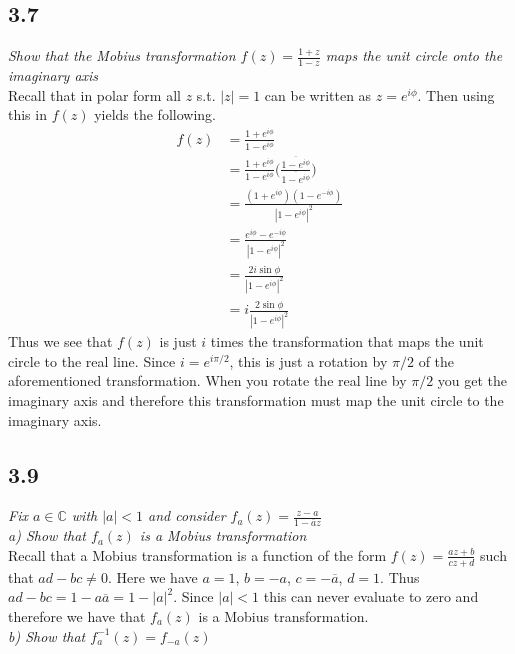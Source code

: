 \documentclass[a4paper, 11pt]{article}
\begin{document}
\subsection*{3.7}
	\textit{Show that the Mobius transformation $f(z) = \frac{1+z}{1-z}$ maps the unit circle onto the imaginary axis}\\ 
	
	\noindent Recall that in polar form all $z$ s.t. $|z|=1$ can be written as $z=e^{i\phi}$. Then using this in $f(z)$ yields the following. 
		\begin{align*}
			f(z) &= \frac{1+e^{i\phi}}{1-e^{i\phi}} \\ 
				&= \frac{1+e^{i\phi}}{1-e^{i\phi}}\Big(\frac{\overline{1-e^{i\phi}}}{\overline{1-e^{i\phi}}}\Big) \\ 
				&= \frac{(1+e^{i\phi})(1-e^{-i\phi})}{|1-e^{i\phi}|^2} \\ 
				&= \frac{e^{i\phi}-e^{-i\phi}}{|1-e^{i\phi}|^2} \\ 
				&= \frac{2i\sin\phi}{|1-e^{i\phi}|^2} \\ 
				&= i \frac{2\sin\phi}{|1-e^{i\phi}|^2}
		\end{align*}	
	\noindent Thus we see that $f(z)$ is just $i$ times the transformation that maps the unit circle to the real line. Since $i=e^{i\pi/2}$, this is just a rotation by $\pi/2$ of the aforementioned  transformation. When you rotate the real line by $\pi/2$ you get the imaginary axis and therefore this transformation must map the unit circle to the imaginary axis.\\
	
\subsection*{3.9}
	\textit{Fix $a\in\mathbb{C}$ with $|a|<1$ and consider $f_a(z)=\frac{z-a}{1-\overline{a}z}$} \\ 
	
	\textit{a) Show that $f_a(z)$ is a Mobius transformation}  \\ 
	
	\noindent Recall that a Mobius transformation is a function of the form $f(z) = \frac{az+b}{cz+d}$ such that $ad-bc\neq 0$. Here we have $a=1$, $b=-a$, $c=-\overline{a}$, $d=1$. Thus $ad-bc =1-a\overline{a}=1-|a|^2$. Since $|a|<1$ this can never evaluate to zero and therefore we have that $f_a(z)$ is a Mobius transformation. \\
	
	\noindent \textit{b) Show that $f_a^{-1}(z) = f_{-a}(z)$ } \\ 
	
\end{document}
